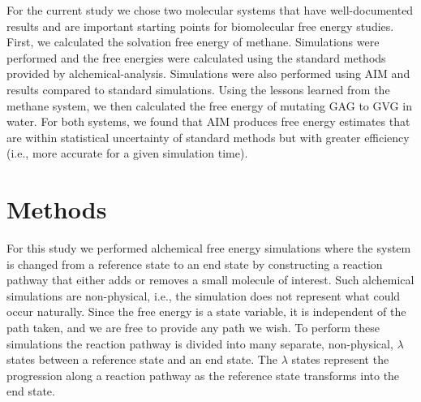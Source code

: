 \documentclass[fleqn,10pt,lineno]{wlpeerj} %
\begin{document}
For the current study we chose two molecular systems that have well-documented results and are important starting points for biomolecular free energy studies. First, we calculated the solvation free energy of methane. Simulations were performed and the free energies were calculated using the standard methods provided by alchemical-analysis. Simulations were also performed using AIM and results compared to standard simulations. Using the lessons learned from the methane system, we then calculated the free energy of mutating GAG to GVG in water. For both systems, we found that AIM produces free energy estimates that are within statistical uncertainty of standard methods but with greater efficiency (i.e., more accurate for a given simulation time).

\section*{Methods} \label{methods}

For this study we performed alchemical free energy simulations where the system is changed from a reference state to an end state by constructing a reaction pathway that either adds or removes a small molecule of interest. Such alchemical simulations are non-physical, i.e., the simulation does not represent what could occur naturally. Since the free energy is a state variable, it is independent of the path taken, and we are free to provide any path we wish. To perform these simulations the reaction pathway is divided into many separate, non-physical, $\lambda$ states between a reference state and an end state. The $\lambda$ states represent the progression along a reaction pathway as the reference state transforms into the end state. 
\end{document}

